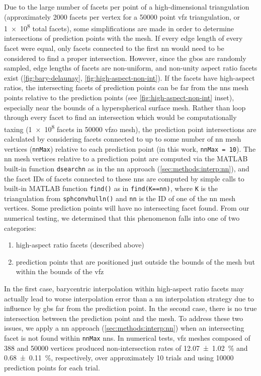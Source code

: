 \documentclass[final,twocolumn,12pt]{elsarticle}
\newcommand{\outpt}{prediction}
\begin{document}
\begin{appendices}
Due to the large number of facets per point of a high-dimensional triangulation (approximately \num{2000} facets per vertex for a \num{50000} point \gls{vfz} triangulation, or \num{1e8} total facets), some simplifications are made in order to determine intersections of \outpt{} points with the mesh. If every edge length of every facet were equal, only facets connected to the first \gls{nn} would need to be considered to find a proper intersection. However, since the \glspl{gbo} are randomly sampled, edge lengths of facets are non-uniform, and non-unity aspect ratio facets exist (\cref{fig:bary-delaunay}, \cref{fig:high-aspect-non-int}). If the facets have high-aspect ratios, the intersecting facets of \outpt{} points can be far from the \glspl{nn} mesh points relative to the \outpt{} points (see \cref{fig:high-aspect-non-int} inset), especially near the bounds of a hyperspherical surface mesh. Rather than loop through every facet to find an intersection which would be computationally taxing (\num{1e8} facets in \num{50000} \gls{vfzo} mesh), the \outpt{} point intersections are calculated by considering facets connected to up to some number of \gls{nn} mesh vertices (\texttt{nnMax}) relative to each \outpt{} point (in this work, \texttt{nnMax = 10}). The \gls{nn} mesh vertices relative to a \outpt{} point are computed via the MATLAB built-in function \texttt{dsearchn} as in the \gls{nn} approach (\cref{sec:methods:interp:nn}), and the facet IDs of facets connected to these \glspl{nn} are computed by simple calls to built-in MATLAB function \texttt{find()} as in \texttt{find(K==nn)}, where \texttt{K} is the triangulation from \texttt{sphconvhulln()} and \texttt{nn} is the ID of one of the \gls{nn} mesh vertices. Some \outpt{} points will have no intersecting facet found.
From our numerical testing, we determined that this phenomenon falls into one of two categories:
\begin{enumerate}
    \item high-aspect ratio facets (described above)
    \item \outpt{} points that are positioned just outside the bounds of the mesh but within the bounds of the \gls{vfz}
\end{enumerate}
In the first case, barycentric interpolation within high-aspect ratio facets may actually lead to worse interpolation error than a \gls{nn} interpolation strategy due to influence by \glspl{gb} far from the \outpt{} point. In the second case, there is no true intersection between the \outpt{} point and the mesh. To address these two issues, we apply a \gls{nn} approach (\cref{sec:methods:interp:nn}) when an intersecting facet is not found within \texttt{nnMax} \glspl{nn}. In numerical tests, \gls{vfz} meshes composed of \num{388} and \num{50000} vertices produced non-intersection rates of \SI{12.07 \pm 1.02}{\percent} and \SI{0.68 \pm 0.11}{\percent}, respectively, over approximately \num{10} trials and using \num{10000} \outpt{} points for each trial. 


\end{appendices}
\end{document}
